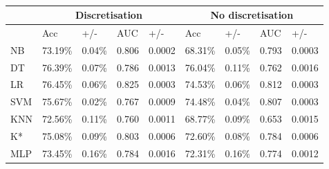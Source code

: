 \begin{table}[htbp]
\caption{}
\begin{tabular}{|l|r|r|r|r|r|r|r|r|}
\hline
 & \multicolumn{ 4}{c|}{Discretisation} & \multicolumn{ 4}{c|}{No discretisation} \\ \hline
 & \multicolumn{1}{l|}{Acc} & \multicolumn{1}{l|}{+/-} & \multicolumn{1}{l|}{AUC} & \multicolumn{1}{l|}{+/-} & \multicolumn{1}{l|}{Acc} & \multicolumn{1}{l|}{+/-} & \multicolumn{1}{l|}{AUC} & \multicolumn{1}{l|}{+/-} \\ \hline
NB & 73.19\% & 0.04\% & 0.806 & 0.0002 & 68.31\% & 0.05\% & 0.793 & 0.0003 \\ \hline
DT & 76.39\% & 0.07\% & 0.786 & 0.0013 & 76.04\% & 0.11\% & 0.762 & 0.0016 \\ \hline
LR & 76.45\% & 0.06\% & 0.825 & 0.0003 & 74.53\% & 0.06\% & 0.812 & 0.0003 \\ \hline
SVM & 75.67\% & 0.02\% & 0.767 & 0.0009 & 74.48\% & 0.04\% & 0.807 & 0.0003 \\ \hline
KNN & 72.56\% & 0.11\% & 0.760 & 0.0011 & 68.77\% & 0.09\% & 0.653 & 0.0015 \\ \hline
K* & 75.08\% & 0.09\% & 0.803 & 0.0006 & 72.60\% & 0.08\% & 0.784 & 0.0006 \\ \hline
MLP & 73.45\% & 0.16\% & 0.784 & 0.0016 & 72.31\% & 0.16\% & 0.774 & 0.0012 \\ \hline
\end{tabular}
\label{}
\end{table}
